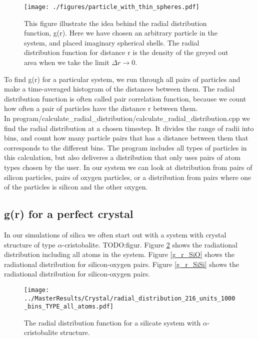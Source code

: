 \begin{figure}[H]
 \centering
 \texttt{[image: ./figures/particle\_with\_thin\_spheres.pdf]}
 \caption{This figure illustrate the idea behind the radial distribution function, g(r). Here we have chosen an arbitrary particle in the system, and placed imaginary spherical shells. The radial distribution function for distance r is the density of the greyed out area when we take the limit $\Delta r \rightarrow 0$.}
 \label{thin_shells}
\end{figure}


To find g(r) for a particular system, we run through all pairs of particles and make a time-averaged histogram of the distances between them. The radial distribution function is often called pair correlation function, because we count how often a pair of particles have the distance r between them.\\
In program/calculate\_radial\_distribution/calculate\_radial\_distribution.cpp we find the radial distribution at a chosen timestep. It divides the range of radii into bins, and count how many particle pairs that has a distance between them that corresponds to the different bins. The program includes all types of particles in this calculation, but also deliveres a distribution that only uses pairs of atom types chosen by the user. In our system we can look at distribution from pairs of silicon particles, pairs of oxygen particles, or a distribution from pairs where one of the particles is silicon and the other oxygen.
\subsection{g(r) for a perfect crystal}
In our simulations of silica we often start out with a system with crystal structure of type $\alpha$-cristobalite. TODO:figur. Figure \ref{g_r_all} shows the radiational distribution including all atoms in the system. Figure \ref{g_r_SiO} shows the radiational distribution for silicon-oxygen pairs. Figure \ref{g_r_SiSi} shows the radiational distribution for silicon-oxygen pairs. 

\begin{figure}[H]
 \centering
 \texttt{[image: ../MasterResults/Crystal/radial\_distribution\_216\_units\_1000\_bins\_TYPE\_all\_atoms.pdf]}
 \caption{The radial distribution function for a silicate system with $\alpha$-cristobalite structure.}
 \label{g_r_all}
\end{figure}

